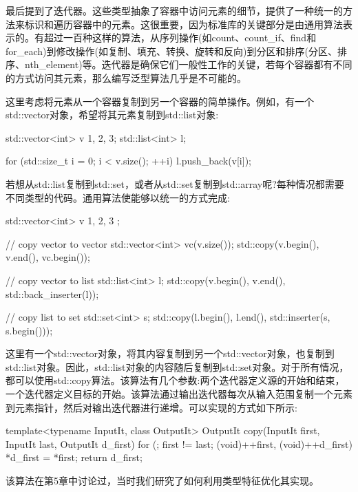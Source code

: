最后提到了迭代器。这些类型抽象了容器中访问元素的细节，提供了一种统一的方法来标识和遍历容器中的元素。这很重要，因为标准库的关键部分是由通用算法表示的。有超过一百种这样的算法，从序列操作(如count、count\_if、find和for\_each)到修改操作(如复制、填充、转换、旋转和反向)到分区和排序(分区、排序、nth\_element)等。迭代器是确保它们一般性工作的关键，若每个容器都有不同的方式访问其元素，那么编写泛型算法几乎是不可能的。

这里考虑将元素从一个容器复制到另一个容器的简单操作。例如，有一个std::vector对象，希望将其元素复制到std::list对象:

\begin{cpp}
std::vector<int> v {1, 2, 3};
std::list<int> l;

for (std::size_t i = 0; i < v.size(); ++i)
	l.push_back(v[i]);
\end{cpp}

若想从std::list复制到std::set，或者从std::set复制到std::array呢?每种情况都需要不同类型的代码。通用算法使能够以统一的方式完成:

\begin{cpp}
std::vector<int> v{ 1, 2, 3 };

// copy vector to vector
std::vector<int> vc(v.size());
std::copy(v.begin(), v.end(), vc.begin());

// copy vector to list
std::list<int> l;
std::copy(v.begin(), v.end(), std::back_inserter(l));

// copy list to set
std::set<int> s;
std::copy(l.begin(), l.end(), std::inserter(s, s.begin()));
\end{cpp}

这里有一个std::vector对象，将其内容复制到另一个std::vector对象，也复制到std::list对象。因此，std::list对象的内容随后复制到std::set对象。对于所有情况，都可以使用std::copy算法。该算法有几个参数:两个迭代器定义源的开始和结束，一个迭代器定义目标的开始。该算法通过输出迭代器每次从输入范围复制一个元素到元素指针，然后对输出迭代器进行递增。可以实现的方式如下所示:

\begin{cpp}
template<typename InputIt, class OutputIt>
OutputIt copy(InputIt first, InputIt last,
			  OutputIt d_first)
{
	for (; first != last; (void)++first, (void)++d_first)
	{
		*d_first = *first;
	}
	return d_first;
}
\end{cpp}

\begin{important}
该算法在第5章中讨论过，当时我们研究了如何利用类型特征优化其实现。
\end{important}

